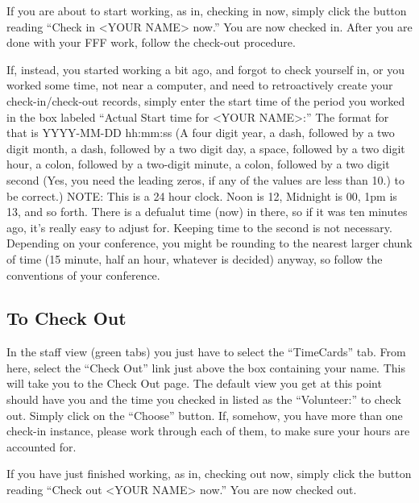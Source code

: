 \documentclass[tablesignature]{scrartcl}
\begin{document}
   If you are about to start working, as in, checking in now, simply
   click the button reading ``Check in <YOUR NAME> now.''  You are now
   checked in.  After you are done with your FFF work, follow the
   check-out procedure.

   If, instead, you started working a bit ago, and forgot to check
   yourself in, or you worked some time, not near a computer, and need
   to retroactively create your check-in/check-out records, simply
   enter the start time of the period you worked in the box labeled
   ``Actual Start time for <YOUR NAME>:'' The format for that is
   YYYY-MM-DD hh:mm:ss (A four digit year, a dash, followed by a two
   digit month, a dash, followed by a two digit day, a space, followed
   by a two digit hour, a colon, followed by a two-digit minute, a
   colon, followed by a two digit second (Yes, you need the leading
   zeros, if any of the values are less than 10.) to be correct.)
   NOTE: This is a 24 hour clock.  Noon is 12, Midnight is 00, 1pm is
   13, and so forth.  There is a defualut time (now) in there, so if
   it was ten minutes ago, it's really easy to adjust for.  Keeping
   time to the second is not necessary.  Depending on your conference,
   you might be rounding to the nearest larger chunk of time (15
   minute, half an hour, whatever is decided) anyway, so follow the
   conventions of your conference.
\subsection{To Check Out}
\label{sec-2_2}


   In the staff view (green tabs) you just have to select the
   ``TimeCards'' tab.  From here, select the ``Check Out'' link just above
   the box containing your name.  This will take you to the Check Out
   page.  The default view you get at this point should have you and
   the time you checked in listed as the ``Volunteer:'' to check out.
   Simply click on the ``Choose'' button.  If, somehow, you have more
   than one check-in instance, please work through each of them, to
   make sure your hours are accounted for.

   If you have just finished working, as in, checking out now, simply
   click the button reading ``Check out <YOUR NAME> now.''  You are now
   checked out.
\end{document}
